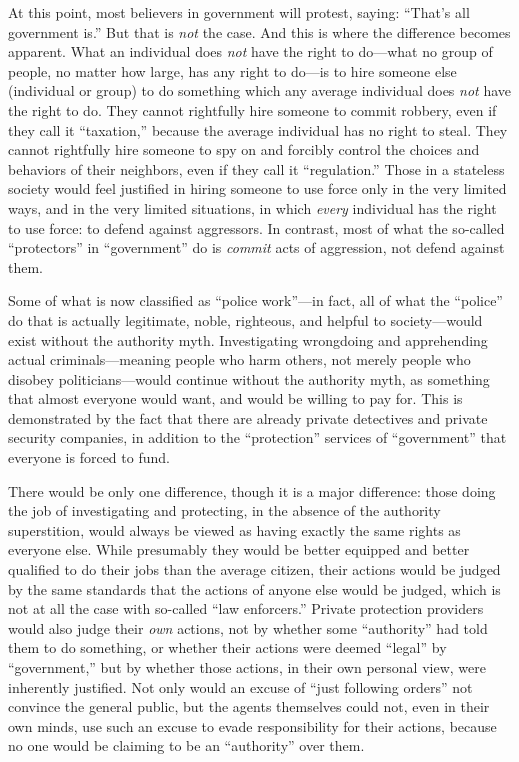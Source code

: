 \documentclass{book}
\begin{document}
At this point, most believers in government will protest, saying: \enquote{That's all government is.} But that is \emph{not} the case. And this is where the difference becomes apparent. What an individual does \emph{not} have the right to do---what no group of people, no matter how large, has any right to do---is to hire someone else (individual or group) to do something which any average individual does \emph{not} have the right to do. They cannot rightfully hire someone to commit robbery, even if they call it \enquote{taxation,} because the average individual has no right to steal. They cannot rightfully hire someone to spy on and forcibly control the choices and behaviors of their neighbors, even if they call it \enquote{regulation.} Those in a stateless society would feel justified in hiring someone to use force only in the very limited ways, and in the very limited situations, in which \emph{every} individual has the right to use force: to defend against aggressors. In contrast, most of what the so-called \enquote{protectors} in \enquote{government} do is \emph{commit} acts of aggression, not defend against them.

Some of what is now classified as \enquote{police work}---in fact, all of what the \enquote{police} do that is actually legitimate, noble, righteous, and helpful to society---would exist without the authority myth. Investigating wrongdoing and apprehending actual criminals---meaning people who harm others, not merely people who disobey politicians---would continue without the authority myth, as something that almost everyone would want, and would be willing to pay for. This is demonstrated by the fact that there are already private detectives and private security companies, in addition to the \enquote{protection} services of \enquote{government} that everyone is forced to fund.

There would be only one difference, though it is a major difference: those doing the job of investigating and protecting, in the absence of the authority superstition, would always be viewed as having exactly the same rights as everyone else. While presumably they would be better equipped and better qualified to do their jobs than the average citizen, their actions would be judged by the same standards that the actions of anyone else would be judged, which is not at all the case with so-called \enquote{law enforcers.} Private protection providers would also judge their \emph{own} actions, not by whether some \enquote{authority} had told them to do something, or whether their actions were deemed \enquote{legal} by \enquote{government,} but by whether those actions, in their own personal view, were inherently justified. Not only would an excuse of \enquote{just following orders} not convince the general public, but the agents themselves could not, even in their own minds, use such an excuse to evade responsibility for their actions, because no one would be claiming to be an \enquote{authority} over them.
\end{document}
